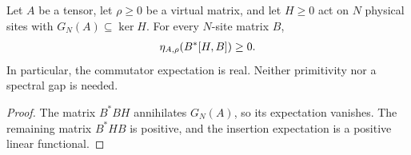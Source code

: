 \begin{lemma}
    \label{thm:local_commutator_expectation_positive}
    \leanok
    Let $A$ be a tensor, let $\rho\geq0$ be a virtual matrix, and let $H\geq0$
    act on $N$ physical sites with $G_N(A)\subseteq\ker H$. For every $N$-site
    matrix $B$,
    \begin{align}
        \eta_{A,\rho}(B^*[H,B])\geq0.
        \notag
    \end{align}
    In particular, the commutator expectation is real. Neither primitivity nor a
    spectral gap is needed.
\end{lemma}
\begin{proof}\leanok
    The matrix $B^*BH$ annihilates $G_N(A)$, so its expectation vanishes.
    The remaining matrix $B^*HB$ is positive, and the insertion expectation is a
    positive linear functional.
\end{proof}

